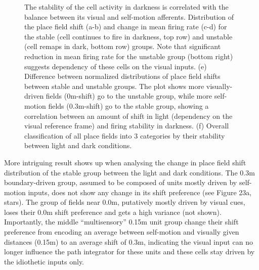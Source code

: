 \begin{figure}
\captionsetup{format=plain}
\caption[Stability explained by self-motion inputs]{
The stability of the cell activity in darkness is correlated with the balance between its visual and self-motion afferents. Distribution of the place field shift (a-b) and change in mean firing rate (c-d) for the stable (cell continues to fire in darkness, top row) and unstable (cell remaps in dark, bottom row) groups. Note that significant reduction in mean firing rate for the unstable group (bottom right) suggests dependency of these cells on the visual inputs. (e) Difference between normalized distributions of place field shifts between stable and unstable groups. The plot shows more visually-driven fields (0m-shift) go to the unstable group, while more self-motion fields (0.3m-shift) go to the stable group, showing a correlation between an amount of shift in light (dependency on the visual reference frame) and firing stability in darkness. (f) Overall classification of all place fields into 3 categories by their stability between light and dark conditions.
}
\label{fig:F22_stable_unstable}
\end{figure}

More intriguing result shows up when analysing the change in place field shift distribution of the stable group between the light and dark conditions. The 0.3m boundary-driven group, assumed to be composed of units mostly driven by self-motion inputs, does not show any change in its shift preference (see Figure 23a, stars). The group of fields near 0.0m, putatively mostly driven by visual cues, loses their 0.0m shift preference and gets a high variance (not shown). Importantly, the middle “multisensory” 0.15m unit group change their shift preference from encoding an average between self-motion and visually given distances (0.15m) to an average shift of 0.3m, indicating the visual input can no longer influence the path integrator for these units and these cells stay driven by the idiothetic inputs only.

